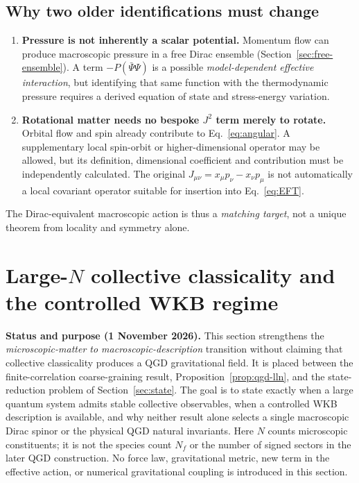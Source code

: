 \documentclass[11pt,a4paper]{article}
\begin{document}
\subsection{Why two older identifications must change}
\begin{enumerate}
\item \textbf{Pressure is not inherently a scalar potential.} Momentum flow can produce macroscopic pressure in a free Dirac ensemble (Section~\ref{sec:free-ensemble}). A term $-P(\bar\Psi\Psi)$ is a possible \emph{model-dependent effective interaction}, but identifying that same function with the thermodynamic pressure requires a derived equation of state and stress-energy variation.
\item \textbf{Rotational matter needs no bespoke $J^2$ term merely to rotate.} Orbital flow and spin already contribute to Eq.~\eqref{eq:angular}. A supplementary local spin-orbit or higher-dimensional operator may be allowed, but its definition, dimensional coefficient and contribution must be independently calculated. The original $J_{\mu\nu}=x_\mu p_\nu-x_\nu p_\mu$ is not automatically a local covariant operator suitable for insertion into Eq.~\eqref{eq:EFT}.
\end{enumerate}
The Dirac-equivalent macroscopic action is thus a \emph{matching target}, not a unique theorem from locality and symmetry alone.


\section{Large-\texorpdfstring{$N$}{N} collective classicality and the controlled WKB regime}
\label{sec:qgd-largeN-semiclassical}
\noindent\textbf{Status and purpose (1 November 2026).}
This section strengthens the \emph{microscopic-matter to macroscopic-description} transition without claiming that collective classicality produces a QGD gravitational field. It is placed between the finite-correlation coarse-graining result, Proposition~\ref{prop:qgd-lln}, and the state-reduction problem of Section~\ref{sec:state}. The goal is to state exactly when a large quantum system admits stable collective observables, when a controlled WKB description is available, and why neither result alone selects a single macroscopic Dirac spinor or the physical QGD natural invariants. Here $N$ counts microscopic constituents; it is not the species count $N_f$ or the number of signed sectors in the later QGD construction. No force law, gravitational metric, new term in the effective action, or numerical gravitational coupling is introduced in this section.
\end{document}
